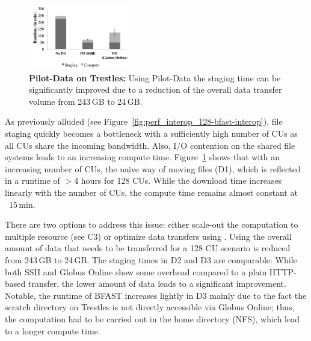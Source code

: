 \documentclass[conference]{IEEEtran}
\begin{document}
\begin{figure}[t]
	\upp
	\centering
		\includegraphics[width=0.4\textwidth]{../perf/sc/pd-128cus.pdf}
	\caption{\textbf{Pilot-Data on Trestles:} Using Pilot-Data the staging time can be 
	significantly improved due to a reduction of the overall data transfer volume from 243\,GB to 24\,GB.\up\up}
	\label{fig:perf_sc_download-concurrent-cus}
\end{figure}

As previously alluded (see Figure~\ref{fig:perf_interop_128-bfast-interop}),
file staging quickly becomes a bottleneck with a sufficiently high number of
CUs as all CUs share the incoming bandwidth. Also, I/O contention on the
shared file systems leads to an increasing compute time.
Figure~\ref{fig:perf_sc_download-concurrent-cus} shows that with an increasing
number of CUs, the naive way of moving files (D1), which is reflected in a
runtime of $>$4 hours for 128 CUs. While the download time increases linearly
with the number of CUs, the compute time remains almost constant at ~15\,min.


There are two options to address this issue: either scale-out the computation
to multiple resource (see C3) or optimize data transfers using \pilotdata.
Using \pilotdata the overall amount of data that needs to be transferred for a
128 CU scenario is reduced from 243\,GB to 24\,GB. The staging times in D2 and
D3 are comparable: While both SSH and Globus Online show some overhead
compared to a plain HTTP-based transfer, the lower amount of data leads to a
significant improvement. Notable, the runtime of BFAST increases lightly in D3
mainly due to the fact the scratch directory on Trestles is not directly
accessible via Globus Online; thus, the computation had to be carried out in
the home directory (NFS), which lead to a longer compute time.

 
\end{document}
